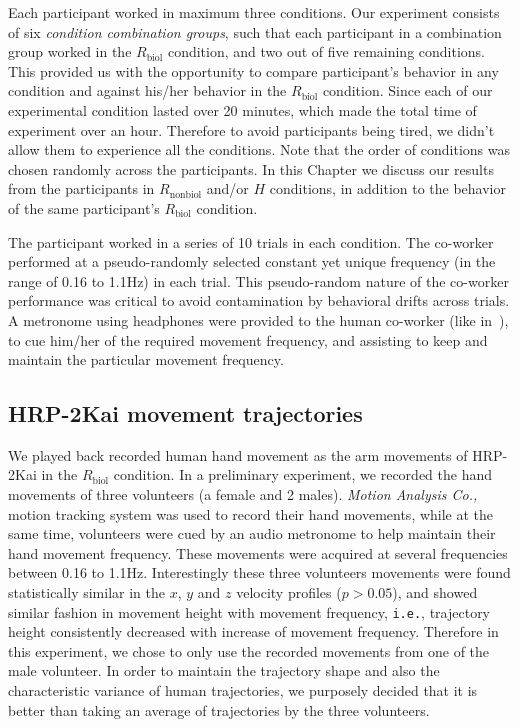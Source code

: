 Each participant worked in maximum three conditions. Our experiment consists of six \emph{condition combination groups}, such that each participant in a combination group worked in the $R_{\text{biol}}$ condition, and two out of five remaining conditions. This provided us with the opportunity to compare participant's behavior in any condition and against his/her behavior in the $R_{\text{biol}}$ condition. Since each of our experimental condition lasted over 20 minutes, which made the total time of experiment over an hour. Therefore to avoid participants being tired, we didn't allow them to experience all the conditions. Note that the order of conditions was chosen randomly across the participants. In this Chapter we discuss our results from the participants in $R_{\text{nonbiol}}$ and/or $H$ conditions, in addition to the behavior of the same participant's $R_{\text{biol}}$ condition.

The participant worked in a series of 10 trials in each condition. The co-worker performed at a pseudo-randomly selected constant yet unique frequency (in the range of 0.16 to 1.1Hz) in each trial. This pseudo-random nature of the co-worker performance was critical to avoid contamination by behavioral drifts across trials. A metronome using headphones were provided to the human co-worker (like in~\cite{Bisio:PlosOne:2014}), to cue him/her of the required movement frequency, and assisting to keep and maintain the particular movement frequency.

\subsection{HRP-2Kai movement trajectories} \label{hrpTraj}

We played back recorded human hand movement as the arm movements of HRP-2Kai in the $R_{\text{biol}}$ condition. In a preliminary experiment, we recorded the hand movements of three volunteers (a female and 2 males). {\it Motion Analysis Co.,} motion tracking system was used to record their hand movements, while at the same time, volunteers were cued by an audio metronome to help maintain their hand movement frequency. These movements were acquired at several frequencies between 0.16 to 1.1Hz. Interestingly these three volunteers movements were found statistically similar in the $x$, $y$ and $z$ velocity profiles ($p > 0.05$), and showed similar fashion in movement height with movement frequency, \texttt{i.e.}, trajectory height consistently decreased with increase of movement frequency. Therefore in this experiment, we chose to only use the recorded movements from one of the male volunteer. In order to maintain the trajectory shape and also the characteristic variance of human trajectories, we purposely decided that it is better than taking an average of trajectories by the three volunteers. 

